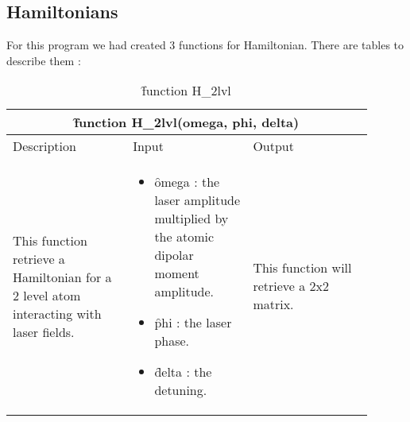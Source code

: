 \documentclass[1pt, a4paper]{article}
\begin{document}
\subsection{Hamiltonians}
\label{sub:ham}
\noindent
For this program we had created 3 functions for Hamiltonian. There are tables to describe them :
\begin{table}[htbp]
    \begin{center}
        \begin{tabular}{p{0.3\linewidth} p{0.3\linewidth} p{0.3\linewidth}} \toprule
            \multicolumn{3}{c}{\f{function H_2lvl(omega, phi, delta)}}\\
            \midrule
            \hfil Description & \hfil Input & \hfil Output\\
            \cmidrule(r){1-1} \cmidrule{2-2} \cmidrule(l){3-3}
           
            This function retrieve a Hamiltonian for a 2 level atom interacting with laser fields.&
            \vspace*{-8pt}
            \begin{itemize}[leftmargin=15pt, itemsep=0pt, topsep=0pt]
            \item \f{omega} : the laser amplitude multiplied by the atomic dipolar moment amplitude.
            \item \f{phi} : the laser phase.
            \item \f{delta} : the detuning.
            \end{itemize}
            &
            This function will retrieve a 2x2 matrix.\\
            \bottomrule
        \end{tabular}
    \end{center}
    \caption{\f{function H_2lvl}}
    \label{tab:H2lvl}
\end{table}
\newpage\noindent
\end{document}
